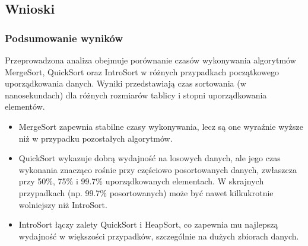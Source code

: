 \documentclass[polish,a4paper]{article}
\begin{document}
\newpage

\subsection{Wnioski}
\subsubsection{Podsumowanie wyników}
Przeprowadzona analiza obejmuje porównanie czasów wykonywania algorytmów MergeSort, QuickSort oraz IntroSort w różnych przypadkach początkowego uporządkowania danych. Wyniki przedstawiają czas sortowania (w nanosekundach) dla różnych rozmiarów tablicy i stopni uporządkowania elementów.

\begin{itemize}
    \item{MergeSort zapewnia stabilne czasy wykonywania, lecz są one wyraźnie wyższe niż w przypadku pozostałych algorytmów.}
    \item{QuickSort wykazuje dobrą wydajność na losowych danych, ale jego czas wykonania znacząco rośnie przy częściowo posortowanych danych, zwłaszcza przy 50\%, 75\% i 99.7\% uporządkowanych elementach. W skrajnych przypadkach (np. 99.7\% posortowanych) może być nawet kilkukrotnie wolniejszy niż IntroSort.}
    \item{IntroSort łączy zalety QuickSort i HeapSort, co zapewnia mu najlepszą wydajność w większości przypadków, szczególnie na dużych zbiorach danych.}
\end{itemize}
\end{document}
